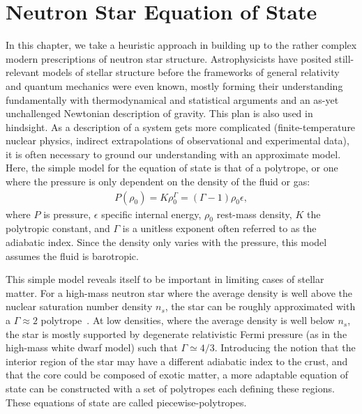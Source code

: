 \chapter{Neutron Star Equation of State}
\label{chap:chapter-2}

In this chapter, we take a heuristic approach in building up to the rather complex modern prescriptions of neutron star structure. 
Astrophysicists have posited still-relevant models of stellar structure before the frameworks of general relativity and quantum mechanics were even known, mostly forming their understanding fundamentally with thermodynamical and statistical arguments and an as-yet unchallenged Newtonian description of gravity.
This plan is also used in hindsight.
As a description of a system gets more complicated (finite-temperature nuclear physics, indirect extrapolations of observational and experimental data), it is often necessary to ground our understanding with an approximate model.
Here, the simple model for the equation of state is that of a polytrope, or one where the pressure is only dependent on the density of the fluid or gas:
\begin{align}
P(\rho_0) = K \rho_0^\Gamma = (\Gamma -  1) \rho_0 \epsilon,
\end{align}
where $P$ is pressure, $\epsilon$ specific internal energy, $\rho_0$ rest-mass density, $K$ the polytropic constant, and $\Gamma$ is a unitless exponent often referred to as the adiabatic index.
Since the density only varies with the pressure, this model assumes the fluid is barotropic.

This simple model reveals itself to be important in limiting cases of stellar matter.  
For a high-mass neutron star where the average density is well above the nuclear saturation number density $n_s$, the star can be roughly approximated with a $\Gamma \approx 2$ polytrope~\cite{lattimer2016equation}.  
At low densities, where the average density is well below $n_s$, the star is mostly supported by degenerate relativistic Fermi pressure (as in the high-mass white dwarf model) such that $\Gamma \simeq 4/3$.
Introducing the notion that the interior region of the star may have a different adiabatic index to the crust, and that the core could be composed of exotic matter, a more adaptable equation of state can be constructed with a set of polytropes each defining these regions.  
These equations of state are called piecewise-polytropes.  

